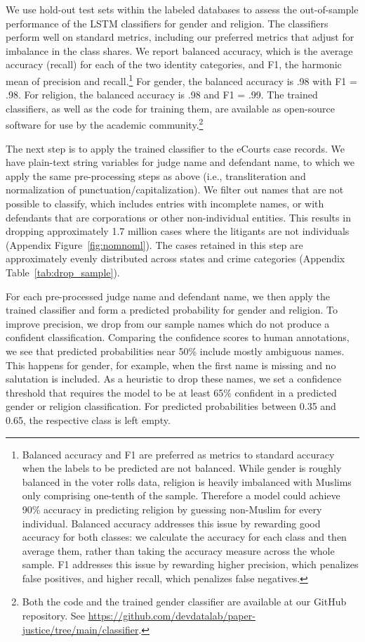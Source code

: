 \documentclass[12pt,english]{article}
\begin{document}
We use hold-out test sets within the labeled databases to assess the out-of-sample performance of the LSTM classifiers for gender and religion. The classifiers perform well on standard metrics, including our preferred metrics that adjust for imbalance in the class shares. We report balanced accuracy, which is the average accuracy (recall) for each of the two identity categories, and F1, the harmonic mean of precision and recall.\footnote{Balanced accuracy and F1 are preferred as metrics to standard accuracy when the labels to be predicted are not balanced. While gender is roughly balanced in the voter rolls data, religion is heavily imbalanced with Muslims only comprising one-tenth of the sample. Therefore a model could achieve 90\% accuracy in predicting religion by guessing non-Muslim for every individual. Balanced accuracy addresses this issue by rewarding good accuracy for both classes: we calculate the accuracy for each class and then average them, rather than taking the accuracy measure across the whole sample. F1 addresses this issue by rewarding higher precision, which penalizes false positives, and higher recall, which penalizes false negatives.}  For gender, the balanced accuracy is .98 with F1 = .98. For religion, the balanced accuracy is .98 and F1 = .99. The trained classifiers, as well as the code for training them, are available as open-source software for use by the academic community.\footnote{Both the code and the trained gender classifier are available at our GitHub repository. See \url{https://github.com/devdatalab/paper-justice/tree/main/classifier}.}

The next step is to apply the trained classifier to the eCourts case records. We have plain-text string variables for judge name and defendant name, to which we apply the same pre-processing steps as above (i.e., transliteration and normalization of punctuation/capitalization). We filter out names that are not possible to classify, which includes entries with incomplete names, or with defendants that are corporations or other non-individual entities. This results in dropping approximately 1.7 million cases where the litigants are not individuals (Appendix Figure~\ref{fig:nomnoml}). The cases retained in this step are approximately evenly distributed across states and crime categories (Appendix Table~\ref{tab:drop_sample}).

For each pre-processed judge name and defendant name, we then apply the trained classifier and form a predicted probability for gender and religion. To improve precision, we drop from our sample names which do not produce a confident classification. Comparing the confidence scores to human annotations, we see that predicted probabilities near 50\% include mostly ambiguous names. This happens for gender, for example, when the first name is missing and no salutation is included.  As a heuristic to drop these names, we set a confidence threshold that requires the model to be at least 65\% confident in a predicted gender or religion classification. For predicted probabilities between 0.35 and 0.65, the respective class is left empty. 
\end{document}
